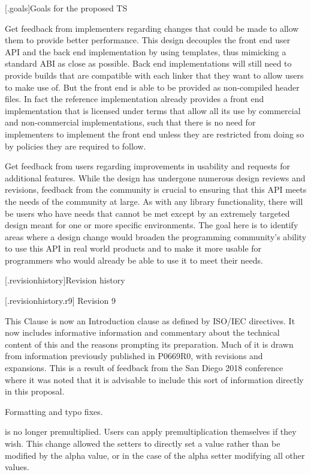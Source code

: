 [\iotwod.goals]{Goals for the proposed TS}

\pnum
Get feedback from implementers regarding changes that could be made to allow them to provide better performance. This design decouples the front end user API and the back end implementation by using templates, thus mimicking a standard ABI as close as possible. Back end implementations will still need to provide builds that are compatible with each linker that they want to allow users to make use of. But the front end is able to be provided as non-compiled header files. In fact the reference implementation already provides a front end implementation that is licensed under terms that allow all its use by commercial and non-commercial implementations, such that there is no need for implementers to implement the front end unless they are restricted from doing so by policies they are required to follow.

\pnum
Get feedback from users regarding improvements in usability and requests for additional features. While the design has undergone numerous design reviews and revisions, feedback from the \Cpp{} community is crucial to ensuring that this API meets the needs of the community at large. As with any library functionality, there will be users who have needs that cannot be met except by an extremely targeted design meant for one or more specific environments. The goal here is to identify areas where a design change would broaden the \Cpp{} programming community's ability to use this API in real world products and to make it more usable for \Cpp{} programmers who would already be able to use it to meet their needs.

[\iotwod.revisionhistory]{Revision history}

 [\iotwod.revisionhistory.r9] {Revision 9}

\pnum
This Clause is now an Introduction clause as defined by ISO/IEC directives. It now includes informative information and commentary about the technical content of this \documenttypename{} and the reasons prompting its preparation. Much of it is drawn from information previously published in P0669R0, with revisions and expansions. This is a result of feedback from the San Diego 2018 conference where it was noted that it is advisable to include this sort of information directly in this proposal.

\pnum
Formatting and typo fixes.

\pnum
{} is no longer premultiplied. Users can apply premultiplication themselves if they wish. This change allowed the setters to directly set a value rather than be modified by the alpha value, or in the case of the alpha setter modifying all other values.

